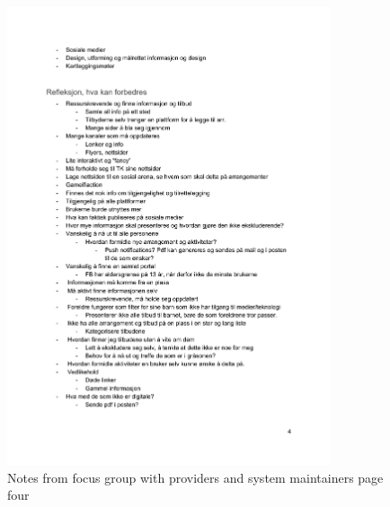 \begin{figure}[H]
\centering
    \includegraphics[width=0.85\textwidth]{fig/workshop/providers/WSTilbydere_4.pdf}
    \caption{Notes from focus group with providers and system maintainers page four}
    \label{Provider_4}
\end{figure}

